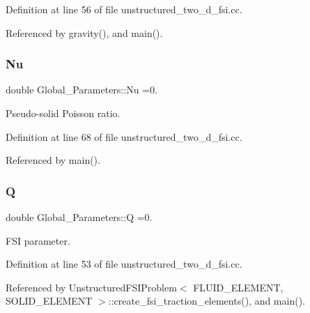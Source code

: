 Definition at line 56 of file unstructured\+\_\+two\+\_\+d\+\_\+fsi.\+cc.



Referenced by gravity(), and main().

\mbox{\label{namespaceGlobal__Parameters_a20fccdcfa2c15ad8b951b9ada3bb1661}} 
\subsubsection{\texorpdfstring{Nu}{Nu}}
{\footnotesize\ttfamily double Global\+\_\+\+Parameters\+::\+Nu =0.}



Pseudo-\/solid Poisson ratio. 



Definition at line 68 of file unstructured\+\_\+two\+\_\+d\+\_\+fsi.\+cc.



Referenced by main().

\mbox{\label{namespaceGlobal__Parameters_a7814fddf663e56168174a42d2cd6b4c1}} 
\subsubsection{\texorpdfstring{Q}{Q}}
{\footnotesize\ttfamily double Global\+\_\+\+Parameters\+::Q =0.}



F\+SI parameter. 



Definition at line 53 of file unstructured\+\_\+two\+\_\+d\+\_\+fsi.\+cc.



Referenced by Unstructured\+F\+S\+I\+Problem$<$ F\+L\+U\+I\+D\+\_\+\+E\+L\+E\+M\+E\+N\+T, S\+O\+L\+I\+D\+\_\+\+E\+L\+E\+M\+E\+N\+T $>$\+::create\+\_\+fsi\+\_\+traction\+\_\+elements(), and main().

\mbox{\label{namespaceGlobal__Parameters_a9d72e94a9305c6a310940a6a427ebe06}} 
